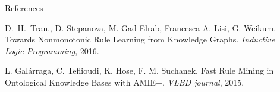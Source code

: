 \documentclass[t,final,hyperref={pdfpagelabels=true}]{beamer}
\newcommand{\bl}[1]{\textcolor{blue}{#1}}
\newcommand{\gr}[1]{\textcolor{darkgreen}{#1}}
\begin{document}
\begin{frame}
\begin{columns}[t]
\begin{column}{.5\textwidth}
\begin{block}{References}
\begin{thebibliography}{10}
{{						
						D.~H.~Tran., D. Stepanova, M. Gad-Elrab, Francesca A. Lisi, G. Weikum. Towards Nonmonotonic Rule Learning from Knowledge Graphs. {\em Inductive Logic Programming}, 2016.
																		
						 L. Gal{\'{a}}rraga, C. Teflioudi, K. Hose, F. M. Suchanek.
						Fast Rule Mining in Ontological Knowledge Bases with AMIE+.
						{\em VLBD journal}, 2015.				
					}}
										
										
										
										
				\end{thebibliography}
								
			\end{block}
						
		\end{column}
				
		\begin{column}{0.5\textwidth}
		\end{column}
	\end{columns}
		

\end{frame}
\end{document}

